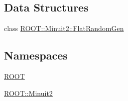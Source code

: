 \subsection*{Data Structures}
\begin{DoxyCompactItemize}
\item 
class \mbox{\hyperlink{classROOT_1_1Minuit2_1_1FlatRandomGen}{R\+O\+O\+T\+::\+Minuit2\+::\+Flat\+Random\+Gen}}
\end{DoxyCompactItemize}
\subsection*{Namespaces}
\begin{DoxyCompactItemize}
\item 
 \mbox{\hyperlink{namespaceROOT}{R\+O\+OT}}
\item 
 \mbox{\hyperlink{namespaceROOT_1_1Minuit2}{R\+O\+O\+T\+::\+Minuit2}}
\end{DoxyCompactItemize}
